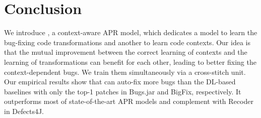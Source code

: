 \section{Conclusion}


We introduce {\tool}, a context-aware APR model, which
dedicates a model to learn the bug-fixing code transformations 
and another to learn code contexts. Our idea is that the mutual
improvement between the correct learning of contexts and the learning
of transformations can benefit for each other, leading to better
fixing the context-dependent bugs.
%
We train them simultaneously
via a cross-stitch unit.
Our empirical results show that {\tool} can auto-fix
more bugs than the DL-based baselines with only
the top-1 patches in Bugs.jar and BigFix, respectively.
It outperforms most of state-of-the-art APR models and complement with Recoder in Defects4J.
